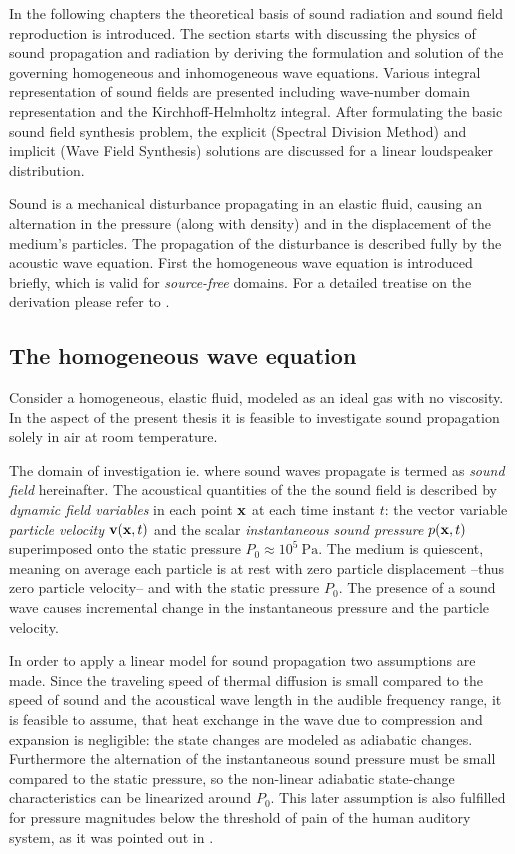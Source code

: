 In the following chapters the theoretical basis of sound radiation and sound field reproduction is introduced. The section starts with discussing the physics of sound propagation and radiation by deriving the formulation and solution of the governing homogeneous and inhomogeneous wave equations. Various integral representation of sound fields are presented including wave-number domain representation and the Kirchhoff-Helmholtz integral. After formulating the basic sound field synthesis problem, the explicit (Spectral Division Method) and implicit (Wave Field Synthesis) solutions are discussed for a linear loudspeaker distribution.
%

Sound is a mechanical disturbance propagating in an elastic fluid, causing an alternation in the pressure (along with density) and in the displacement of the medium's particles. The propagation of the disturbance is described fully by the acoustic wave equation. First the homogeneous wave equation is introduced briefly, which is valid for \emph{source-free} domains. For a detailed treatise on the derivation please refer to \cite{Beranek1993, Morse1968, Williams1999, Blackstock2000}.

\subsection{The homogeneous wave equation}

Consider a homogeneous, elastic fluid, modeled as an ideal gas with no viscosity. In the aspect of the present thesis it is feasible to investigate sound propagation solely in air at room temperature. 

%
The domain of investigation ie. where sound waves propagate is termed as \emph{sound field} hereinafter.
The acoustical quantities of the the sound field is described by \emph{dynamic field variables} in each point $\mathbf{x}$ at each time instant $t$: the vector variable \emph{particle velocity} $\mathbf{v}(\mathbf{x},t)$ and the scalar \emph{instantaneous sound pressure} $p(\mathbf{x},t)$ superimposed onto the static pressure $P_0 \approx 10^5~\mathrm{Pa}$.
The medium is quiescent, meaning on average each particle is at rest with zero particle displacement --thus zero particle velocity-- and with the static pressure $P_0$. 
The presence of a sound wave causes incremental change in the instantaneous pressure and the particle velocity.
%

In order to apply a linear model for sound propagation two assumptions are made.
Since the traveling speed of thermal diffusion is small compared to the speed of sound and the acoustical wave length in the audible frequency range, it is feasible to assume, that heat exchange in the wave due to compression and expansion is negligible: the state changes are modeled as adiabatic changes.
Furthermore the alternation of the instantaneous sound pressure must be small compared to the static pressure, so the non-linear adiabatic state-change characteristics can be linearized around $P_0$. This later assumption is also fulfilled for pressure magnitudes below the threshold of pain of the human auditory system, as it was pointed out in \cite{Gumerov2004, Ahrens2012}.
%

